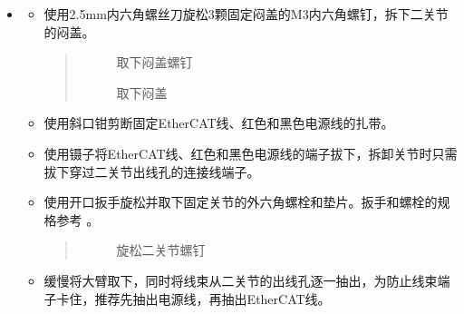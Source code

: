 \documentclass[a4paper,11pt,english,openany,oneside]{sphinxmanual}
\begin{document}
\begin{itemize}
\item {} 
\sphinxAtStartPar
{}
\begin{itemize}
\item {} 
\sphinxAtStartPar
使用2.5mm内六角螺丝刀旋松3颗固定闷盖的M3内六角螺钉，拆下二关节的闷盖。
\begin{quote}

\begin{figure}[H]
\centering
\capstart

\noindent{}
\caption{取下闷盖螺钉}\label{\detokenize{_u66f4_u6362_u5173_u8282:id32}}\end{figure}

\begin{figure}[H]
\centering
\capstart

\noindent{}
\caption{取下闷盖}\label{\detokenize{_u66f4_u6362_u5173_u8282:id33}}\end{figure}
\end{quote}

\item {} 
\sphinxAtStartPar
使用斜口钳剪断固定EtherCAT线、红色和黑色电源线的扎带。

\item {} 
\sphinxAtStartPar
使用镊子将EtherCAT线、红色和黑色电源线的端子拔下，拆卸关节时只需拔下穿过二关节出线孔的连接线端子。

\item {} 
\sphinxAtStartPar
使用开口扳手旋松并取下固定关节的外六角螺栓和垫片。扳手和螺栓的规格参考 {\hyperref[\detokenize{_u66f4_u6362_u5173_u8282:id9}]{}} 。
\begin{quote}

\begin{figure}[H]
\centering
\capstart

\noindent{}
\caption{旋松二关节螺钉}\label{\detokenize{_u66f4_u6362_u5173_u8282:id34}}\end{figure}
\end{quote}

\item {} 
\sphinxAtStartPar
缓慢将大臂取下，同时将线束从二关节的出线孔逐一抽出，为防止线束端子卡住，推荐先抽出电源线，再抽出EtherCAT线。
\begin{quote}

\begin{figure}[H]
\centering
\capstart


\end{figure}
\end{quote}
\end{itemize}
\end{itemize}
\end{document}
